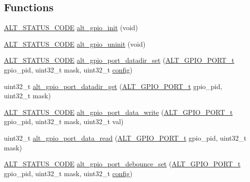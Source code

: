 \subsection*{Functions}
\begin{DoxyCompactItemize}
\item 
\mbox{\hyperlink{hwlib_8h_abdb0d369f069723ca55d6c94bcaaaa12}{A\+L\+T\+\_\+\+S\+T\+A\+T\+U\+S\+\_\+\+C\+O\+DE}} \mbox{\hyperlink{group__ALT__GPIO__API__CONFIG_ga73f3803528b84ab1993572562614b3ed}{alt\+\_\+gpio\+\_\+init}} (void)
\item 
\mbox{\hyperlink{hwlib_8h_abdb0d369f069723ca55d6c94bcaaaa12}{A\+L\+T\+\_\+\+S\+T\+A\+T\+U\+S\+\_\+\+C\+O\+DE}} \mbox{\hyperlink{group__ALT__GPIO__API__CONFIG_gab11a905441c80c990100c33b4dac01a5}{alt\+\_\+gpio\+\_\+uninit}} (void)
\item 
\mbox{\hyperlink{hwlib_8h_abdb0d369f069723ca55d6c94bcaaaa12}{A\+L\+T\+\_\+\+S\+T\+A\+T\+U\+S\+\_\+\+C\+O\+DE}} \mbox{\hyperlink{group__ALT__GPIO__API__CONFIG_gae7ff5fe93b46ea71b6983b1cc15177f8}{alt\+\_\+gpio\+\_\+port\+\_\+datadir\+\_\+set}} (\mbox{\hyperlink{group__ALT__GPIO__API__CONFIG_gaaf1cf0e2a720d20cd883810f2b59097e}{A\+L\+T\+\_\+\+G\+P\+I\+O\+\_\+\+P\+O\+R\+T\+\_\+t}} gpio\+\_\+pid, uint32\+\_\+t mask, uint32\+\_\+t \mbox{\hyperlink{structconfig__s}{config}})
\item 
uint32\+\_\+t \mbox{\hyperlink{group__ALT__GPIO__API__CONFIG_ga9e13616f27e42a4befa4faf31fcba910}{alt\+\_\+gpio\+\_\+port\+\_\+datadir\+\_\+get}} (\mbox{\hyperlink{group__ALT__GPIO__API__CONFIG_gaaf1cf0e2a720d20cd883810f2b59097e}{A\+L\+T\+\_\+\+G\+P\+I\+O\+\_\+\+P\+O\+R\+T\+\_\+t}} gpio\+\_\+pid, uint32\+\_\+t mask)
\item 
\mbox{\hyperlink{hwlib_8h_abdb0d369f069723ca55d6c94bcaaaa12}{A\+L\+T\+\_\+\+S\+T\+A\+T\+U\+S\+\_\+\+C\+O\+DE}} \mbox{\hyperlink{group__ALT__GPIO__API__CONFIG_ga17555010b17db660fe66b97f8ab7d097}{alt\+\_\+gpio\+\_\+port\+\_\+data\+\_\+write}} (\mbox{\hyperlink{group__ALT__GPIO__API__CONFIG_gaaf1cf0e2a720d20cd883810f2b59097e}{A\+L\+T\+\_\+\+G\+P\+I\+O\+\_\+\+P\+O\+R\+T\+\_\+t}} gpio\+\_\+pid, uint32\+\_\+t mask, uint32\+\_\+t val)
\item 
uint32\+\_\+t \mbox{\hyperlink{group__ALT__GPIO__API__CONFIG_gaedba1cb550b10857f2d69adea7f5e181}{alt\+\_\+gpio\+\_\+port\+\_\+data\+\_\+read}} (\mbox{\hyperlink{group__ALT__GPIO__API__CONFIG_gaaf1cf0e2a720d20cd883810f2b59097e}{A\+L\+T\+\_\+\+G\+P\+I\+O\+\_\+\+P\+O\+R\+T\+\_\+t}} gpio\+\_\+pid, uint32\+\_\+t mask)
\item 
\mbox{\hyperlink{hwlib_8h_abdb0d369f069723ca55d6c94bcaaaa12}{A\+L\+T\+\_\+\+S\+T\+A\+T\+U\+S\+\_\+\+C\+O\+DE}} \mbox{\hyperlink{group__ALT__GPIO__API__CONFIG_ga7464ad71bf31ecc59943be3df4f58c1f}{alt\+\_\+gpio\+\_\+port\+\_\+debounce\+\_\+set}} (\mbox{\hyperlink{group__ALT__GPIO__API__CONFIG_gaaf1cf0e2a720d20cd883810f2b59097e}{A\+L\+T\+\_\+\+G\+P\+I\+O\+\_\+\+P\+O\+R\+T\+\_\+t}} gpio\+\_\+pid, uint32\+\_\+t mask, uint32\+\_\+t \mbox{\hyperlink{structconfig__s}{config}})

\end{DoxyCompactItemize}
